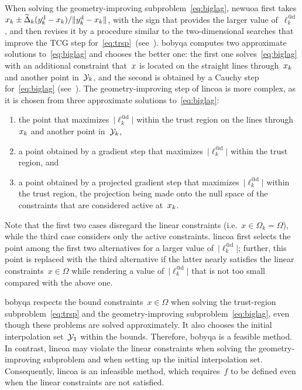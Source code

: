 \documentclass[
    smallextended,  %
    final,          %
]{svjour3}
\newcommand{\abs}[2][]{#1\lvert#2#1\rvert}
\newcommand{\norm}[2][]{#1\lVert#2#1\rVert}
\newcommand{\drop}{{\text{d}}}
\newcommand{\fsetm}[1][k]{\Omega_{#1}}
\newcommand{\fset}{\Omega}
\newcommand{\iter}[1][k]{x\ifthenelse{\equal{#1}{}}{}{_{#1}}}
\newcommand{\obj}{f}
\newcommand{\radalt}[1][k]{\widetilde{\Delta}\ifthenelse{\equal{#1}{}}{}{_{#1}}}
\newcommand{\xpt}[1][k]{\mathcal{Y}\ifthenelse{\equal{#1}{}}{}{_{#1}}}
\begin{document}
When solving the geometry-improving subproblem~\eqref{eq:biglag}, \gls{newuoa} first takes $\iter \pm \radalt (y_k^\drop - \iter)/\norm{y_k^\drop -\iter}$, with the sign that provides the larger value of~$\ell_k^{@\drop}$, and then revises it by a procedure similar to the two-dimensional searches that improve the TCG step for~\eqref{eq:trsp}~(see~\cite[\S~6]{Powell_2006}).
\Gls{bobyqa} computes two approximate solutions to~\eqref{eq:biglag} and chooses the better one: the first one solves~\eqref{eq:biglag} with an additional constraint that~$\iter[]$ is located on the straight lines through~$\iter$ and another point in~$\xpt$, and the second is obtained by a Cauchy step for~\eqref{eq:biglag} (see~\cite[\S~3]{Powell_2009}).
The geometry-improving step of \gls{lincoa} is more complex, as it is chosen from three approximate solutions to~\eqref{eq:biglag}:
\begin{enumerate}
    \item the point that maximizes~$\abs{\ell_k^{@\drop}}$ within the trust region on the lines through~$\iter$ and another point in~$\xpt$,
    \item a point obtained by a gradient step that maximizes~$\abs{\ell_k^{@\drop}}$ within the trust region, and
    \item a point obtained by a projected gradient step that maximizes~$\abs{\ell_k^{@\drop}}$ within the trust region, the projection being made onto the null space of the constraints that are considered active at~$\iter$.
\end{enumerate}
Note that the first two cases disregard the linear constraints (i.e.~$x\in\fsetm = \fset$), while the third case considers only the active constraints.
\Gls{lincoa} first selects the point among the first two alternatives for a larger value of~$\abs{\ell_k^{@\drop}}$; further, this point is replaced with the third alternative if the latter nearly satisfies the linear constraints~$x\in\fset$ while rendering a value of~$\abs{\ell_k^{@\drop}}$ that is not too small compared with the above one.

\Gls{bobyqa} respects the bound constraints~$x\in \fset$ when solving the trust-region subproblem~\eqref{eq:trsp} and the geometry-improving subproblem~\eqref{eq:biglag}, even though these problems are solved approximately.
It also chooses the initial interpolation set~$\xpt[1]$ within the bounds.
Therefore, \gls{bobyqa} is a feasible method.
In contrast, \gls{lincoa} may violate the linear constraints when solving the geometry-improving subproblem and when setting up the initial interpolation set.
Consequently, \gls{lincoa} is an infeasible method, which requires~$\obj$ to be defined even when the linear constraints are not satisfied.
\end{document}
